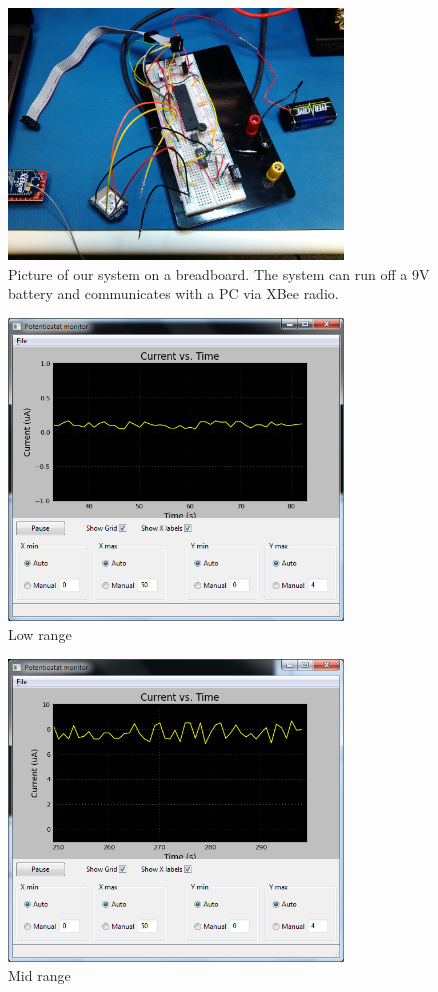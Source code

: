 \begin{figure}[h]
\begin{center}
\includegraphics[width=3.5in]{../figures/board.jpg}
\end{center}
\caption{Picture of our system on a breadboard. The system can run off a 9V battery and communicates with a PC via XBee radio.}
\end{figure}
 
\begin{figure}[h]
\begin{center}
\includegraphics[width=3.5in]{../figures/1Mohm_0,1uA_6,8Mohm.png}
\end{center}
\caption{Low range}
\end{figure}

\begin{figure}[h]
\begin{center}
\includegraphics[width=3.5in]{../figures/1Mohm_8uA_680KOhm.png}
\end{center}
\caption{Mid range}
\end{figure}


